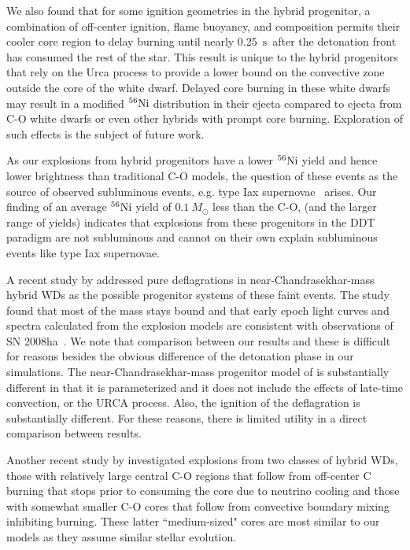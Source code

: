 \documentclass[iop,apj]{emulateapj}
\newcommand{\Ni}[1]{\ensuremath{{}^{#1}{\rm Ni}}}
\newcommand{\unitstyle}[1]{\ensuremath{\mathrm{#1}}}
\newcommand{\second}{\unitstyle{s}}
\newcommand{\Msun}{\ensuremath{M_\odot}}
\begin{document}
We also found that for some ignition geometries in the hybrid
progenitor, a combination of off-center ignition, flame buoyancy, and
composition permits their cooler core region to delay burning until
nearly 0.25~\second\ after the detonation front has consumed the rest
of the star. This result is unique to the hybrid progenitors that rely
on the Urca process to provide a lower bound on the convective zone
outside the core of the white dwarf. Delayed core burning in these
white dwarfs may result in a modified \Ni{56} distribution in their
ejecta compared to ejecta from C-O white dwarfs or even other hybrids
with prompt core burning. Exploration of such effects is the subject
of future work.

As our explosions from hybrid progenitors have a lower \Ni{56} yield
and hence lower brightness than traditional C-O models, the question
of these events as the source of observed subluminous events, e.g.
type Iax supernovae~\citep{foleyetal2013} arises. Our finding of an
average \Ni{56} yield of $0.1~\Msun$ less than the C-O, (and the
larger range of yields) indicates that explosions from these
progenitors in the DDT paradigm are not subluminous and cannot on
their own explain subluminous events like type Iax supernovae.

A recent study by \citet{kromeretal2015} addressed pure deflagrations
in near-Chandrasekhar-mass hybrid WDs as the possible progenitor
systems of these faint events. The study found that most of the mass
stays bound and that early epoch light curves and spectra calculated
from the explosion models are consistent with observations of SN
2008ha~\citep{foleyetal2009}. We note that comparison between our
results and these is difficult for reasons besides the obvious
difference of the detonation phase in our simulations. The
near-Chandrasekhar-mass progenitor model of \citet{kromeretal2015} is
substantially different in that it is parameterized and it does not
include the effects of late-time convection, or the URCA process.
Also, the ignition of the deflagration is substantially different. For
these reasons, there is limited utility in a direct comparison between
results.

Another recent study by \citet{bravoetal2016} investigated explosions
from two classes of hybrid WDs, those with relatively large central
C-O regions that follow from off-center C burning that stops prior
to consuming the core due to neutrino cooling and those with 
somewhat smaller C-O cores that follow from convective boundary mixing
inhibiting burning. These latter ``medium-sized" cores are most similar
to our models as they assume similar stellar evolution.
\end{document}
